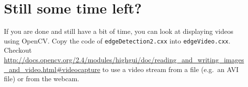 \documentclass[english,a4paper,12pt,oneside]{article}
\begin{document}
\section{Still some time left?}

If you are done and still have a bit of time, you can look at displaying videos using OpenCV.
Copy the code of \verb+edgeDetection2.cxx+ into \verb+edgeVideo.cxx+. 
Checkout \url{http://docs.opencv.org/2.4/modules/highgui/doc/reading_and_writing_images_and_video.html#videocapture} to use a video stream from a file (e.g.~an AVI file) or from the webcam. 


% 
% 
% 
% 
% 
% 
% 
% 
% 
% 
% 
% 
% 
% 
% 
\end{document}

